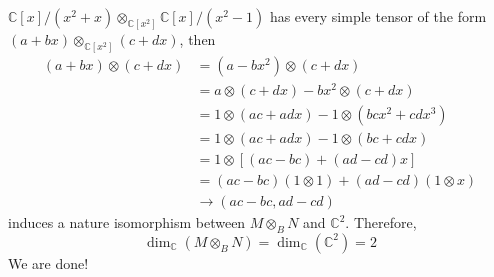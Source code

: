 $\mathbb{C}[x]/(x^2+x)\otimes_{\mathbb{C}[x^2]}\mathbb{C}[x]/(x^2-1)$ has every simple tensor of the form $(a+bx)\otimes_{\mathbb{C}[x^2]}(c+dx )$, then
\[
\begin{aligned}
(a+bx)\otimes (c+dx  ) & =(a-bx^2)\otimes (c+dx) \\
 & =a\otimes (c+dx )-bx^2\otimes (c+dx) \\
 & =1\otimes (ac+adx)-1\otimes (bcx^2+cdx^3) \\
 & =1\otimes (ac+adx)-1\otimes (bc+cdx) \\
 & =1\otimes [(ac-bc)+(ad-cd)x] \\
 & =(ac-bc)(1\otimes 1)+(ad-cd)(1\otimes x)  \\
 & \to(ac-bc,ad-cd)
\end{aligned}
\]
induces a nature isomorphism between $M\otimes_{B}N$ and $\mathbb{C}^2$. Therefore,
\[
\dim _{\mathbb{C}}(M\otimes _{B}N)=\dim _{\mathbb{C}}(\mathbb{C}^2)=2
\]
We are done!
